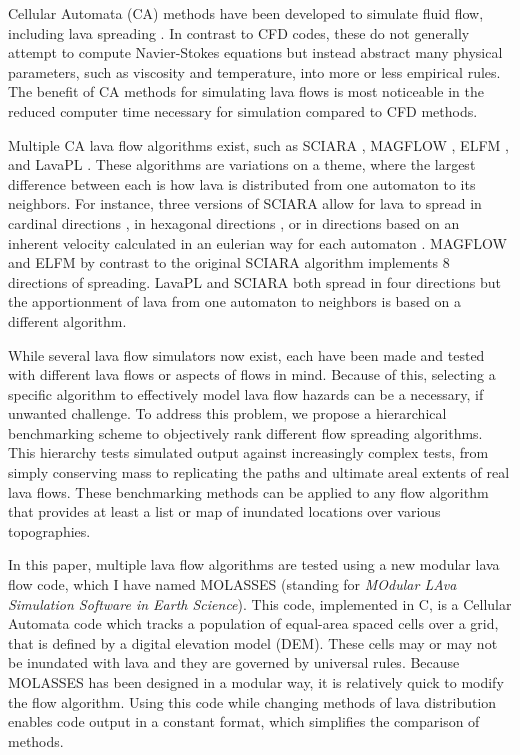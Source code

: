 \documentclass[12pt,letter]{article}
\begin{document}
	Cellular Automata (CA) methods have been developed to simulate fluid flow, including lava spreading \citep{barca1994cellular}. In contrast to CFD codes, these do not generally attempt to compute Navier-Stokes equations but instead abstract many physical parameters, such as viscosity and temperature, into more or less empirical rules. The benefit of CA methods for simulating lava flows is most noticeable in the reduced computer time necessary for simulation compared to CFD methods.
	
	Multiple CA lava flow algorithms exist, such as SCIARA \citep{crisci2004simulation}, MAGFLOW \citep{del2008simulations}, ELFM \citep{damiani2006lava}, and LavaPL \citep{connor2012}. These algorithms are variations on a theme, where the largest difference between each is how lava is distributed from one automaton to its neighbors. For instance, three versions of SCIARA allow for lava to spread in cardinal directions \citep{barca1994cellular}, in hexagonal directions \citep{crisci2008lava}, or in directions based on an inherent velocity calculated in an eulerian way for each automaton \citep{avolio2006sciara}. MAGFLOW and ELFM by contrast to the original SCIARA algorithm implements 8 directions of spreading. LavaPL and SCIARA both spread in four directions but the apportionment of lava from one automaton to neighbors is based on a different algorithm.

	While several lava flow simulators now exist, each have been made and tested with different lava flows or aspects of flows in mind. Because of this, selecting a specific algorithm to effectively model lava flow hazards can be a necessary, if unwanted challenge. To address this problem, we propose a hierarchical benchmarking scheme to objectively rank different flow spreading algorithms. This hierarchy tests simulated output against increasingly complex tests, from simply conserving mass to replicating the paths and ultimate areal extents of real lava flows. These benchmarking methods can be applied to any flow algorithm that provides at least a list or map of inundated locations over various topographies.

	In this paper, multiple lava flow algorithms are tested using a new modular lava flow code, which I have named MOLASSES (standing for \textit{MOdular LAva Simulation Software in Earth Science}). This code, implemented in C, is a Cellular Automata code which tracks a population of equal-area spaced cells over a grid, that is defined by a digital elevation model (DEM). These cells may or may not be inundated with lava and they are governed by universal rules. Because MOLASSES has been designed in a modular way, it is relatively quick to modify the flow algorithm. Using this code while changing methods of lava distribution enables code output in a constant format, which simplifies the comparison of methods.
	
\end{document}

